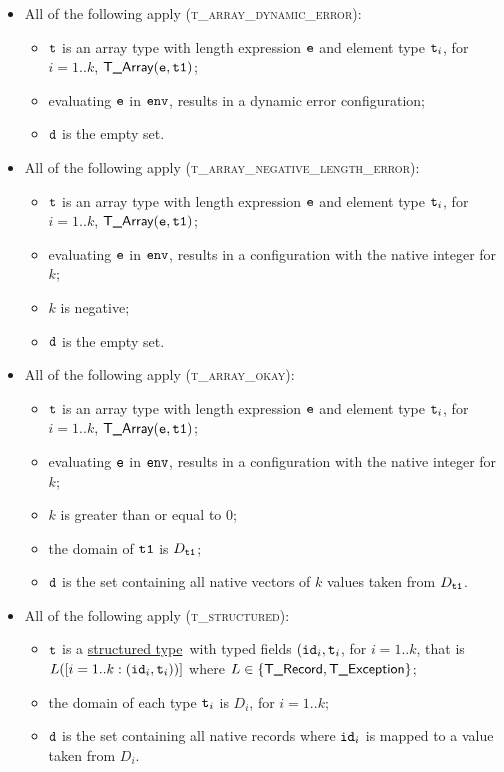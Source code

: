 \documentclass{book}
\newcommand\structuredtype[0]{\hyperlink{def-structuredtype}{structured type}}
\begin{document}
\begin{itemize}
  \item All of the following apply (\textsc{t\_array\_dynamic\_error}):
  \begin{itemize}
    \item $\texttt{t}$ is an array type with length expression $\texttt{e}$ and element type $\texttt{t}_i$, for $i=1..k$, $\textsf{T\_Array}(\texttt{e}, \texttt{t1})$;
    \item evaluating $\texttt{e}$ in $\texttt{env}$, results in a dynamic error configuration;
    \item $\texttt{d}$ is the empty set.
  \end{itemize}

  \item All of the following apply (\textsc{t\_array\_negative\_length\_error}):
  \begin{itemize}
    \item $\texttt{t}$ is an array type with length expression $\texttt{e}$ and element type $\texttt{t}_i$, for $i=1..k$, $\textsf{T\_Array}(\texttt{e}, \texttt{t1})$;
    \item evaluating $\texttt{e}$ in $\texttt{env}$, results in a configuration with the native integer for $k$;
    \item $k$ is negative;
    \item $\texttt{d}$ is the empty set.
  \end{itemize}

  \item All of the following apply (\textsc{t\_array\_okay}):
  \begin{itemize}
    \item $\texttt{t}$ is an array type with length expression $\texttt{e}$ and element type $\texttt{t}_i$, for $i=1..k$, $\textsf{T\_Array}(\texttt{e}, \texttt{t1})$;
    \item evaluating $\texttt{e}$ in $\texttt{env}$, results in a configuration with the native integer for $k$;
    \item $k$ is greater than or equal to $0$;
    \item the domain of $\texttt{t1}$ is $D_{\texttt{t1}}$;
    \item $\texttt{d}$ is the set containing all native vectors of $k$ values taken from $D_{\texttt{t1}}$.
  \end{itemize}

  \item All of the following apply (\textsc{t\_structured}):
  \begin{itemize}
    \item $\texttt{t}$ is a \structuredtype\ with typed fields $(\texttt{id}_i, \texttt{t}_i$, for $i=1..k$, that is $L([i=1..k: (\texttt{id}_i,\texttt{t}_i))]$
    where $L\in\{\textsf{T\_Record}, \textsf{T\_Exception}\}$;
    \item the domain of each type $\texttt{t}_i$ is $D_i$, for $i=1..k$;
    \item $\texttt{d}$ is the set containing all native records where $\texttt{id}_i$ is mapped to a value taken from $D_i$.
  \end{itemize}


\end{itemize}
\end{document}

